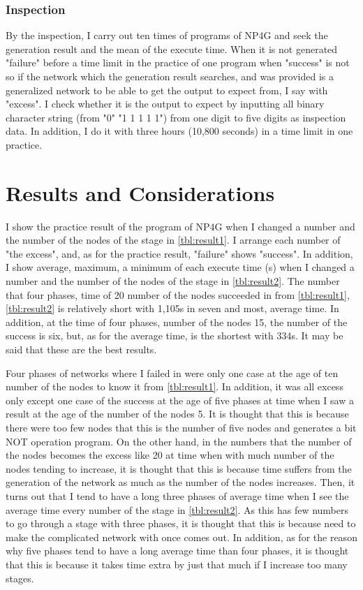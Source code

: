 \documentclass{article}
\begin{document}
\subsubsection {Inspection}
By the inspection, I carry out ten times of programs of NP4G and seek the generation result and the mean of the execute time.
When it is not generated "failure" before a time limit in the practice of one program when "success" is not so if the network which the generation result searches, and was provided is a generalized network to be able to get the output to expect from, I say with "excess".
I check whether it is the output to expect by inputting all binary character string (from "0" "1 1 1 1 1") from one digit to five digits as inspection data.
In addition, I do it with three hours (10,800 seconds) in a time limit in one practice.

\section {Results and Considerations}
I show the practice result of the program of NP4G when I changed a number and the number of the nodes of the stage in \ref{tbl:result1}.
I arrange each number of "the excess", and, as for the practice result, "failure" shows "success".
In addition, I show average, maximum, a minimum of each execute time (s) when I changed a number and the number of the nodes of the stage in \ref{tbl:result2}.
The number that four phases, time of 20 number of the nodes succeeded in from \ref{tbl:result1}, \ref{tbl:result2} is relatively short with 1,105s in seven and most, average time.
In addition, at the time of four phases, number of the nodes 15, the number of the success is six, but, as for the average time, is the shortest with 334s.
It may be said that these are the best results.

Four phases of networks where I failed in were only one case at the age of ten number of the nodes to know it from \ref{tbl:result1}.
In addition, it was all excess only except one case of the success at the age of five phases at time when I saw a result at the age of the number of the nodes 5.
It is thought that this is because there were too few nodes that this is the number of five nodes and generates a bit NOT operation program.
On the other hand, in the numbers that the number of the nodes becomes the excess like 20 at time when with much number of the nodes tending to increase, it is thought that this is because time suffers from the generation of the network as much as the number of the nodes increases.
Then, it turns out that I tend to have a long three phases of average time when I see the average time every number of the stage in \ref{tbl:result2}.
As this has few numbers to go through a stage with three phases, it is thought that this is because need to make the complicated network with once comes out.
In addition, as for the reason why five phases tend to have a long average time than four phases, it is thought that this is because it takes time extra by just that much if I increase too many stages.
\end{document}
